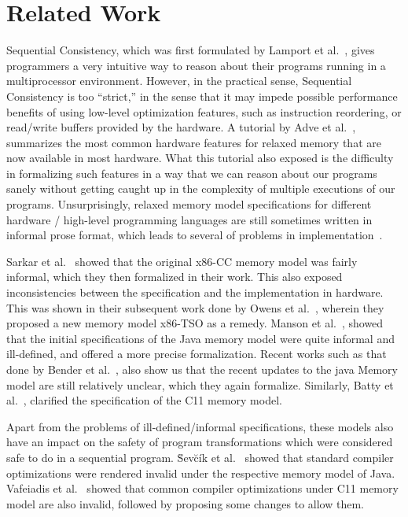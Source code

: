 \section{Related Work}
   Sequential Consistency, which was first formulated by Lamport et al.~\cite{Lamport79}, gives programmers a very intuitive way to reason about their programs running in a multiprocessor environment.
   However, in the practical sense, Sequential Consistency is too ``strict,'' in the sense that it may impede possible performance benefits of using low-level optimization features, such as instruction reordering, or read/write buffers provided by the hardware.
   A tutorial by Adve et al.~\cite{AdveG}, summarizes the most common hardware features for relaxed memory that are now available in most hardware. What this tutorial also exposed is the difficulty in formalizing such features in a way that we can reason about our programs sanely without getting caught up in the complexity of multiple executions of our programs. 
   Unsurprisingly, relaxed memory model specifications for different hardware / high-level programming languages are still sometimes written in informal prose format, which leads to several of problems in implementation~\cite{Sewell}. 
   
   Sarkar et al.~\cite{SarkarS} showed that the original x86-CC memory model was fairly informal, which they then formalized in their work. This also exposed inconsistencies between the specification and the implementation in hardware. This was shown in their subsequent work done by Owens et al.~\cite{OwensS}, wherein they proposed a new memory model x86-TSO as a remedy. 
   Manson et al.~\cite{JeremyM}, showed that the initial specifications of the Java memory model were quite informal and ill-defined, and offered a more precise formalization. Recent works such as that done by Bender et al.~\cite{BenderJ}, also show us that the recent updates to the java Memory model are still relatively unclear, which they again formalize. Similarly, 
   Batty et al.~\cite{BattyM}, clarified the specification of the C11 memory model. 
   
   Apart from the problems of ill-defined/informal specifications, these models also have an impact on the safety of program transformations which were considered safe to do in a sequential program. \u{S}ev\u{c}\'{i}k et al.~\cite{SevcikJ} showed that standard compiler optimizations were rendered invalid under the respective memory model of Java. Vafeiadis et al.~\cite{VafeiadisV} showed that common compiler optimizations under C11 memory model are also invalid, followed by proposing some changes to allow them. 
   

